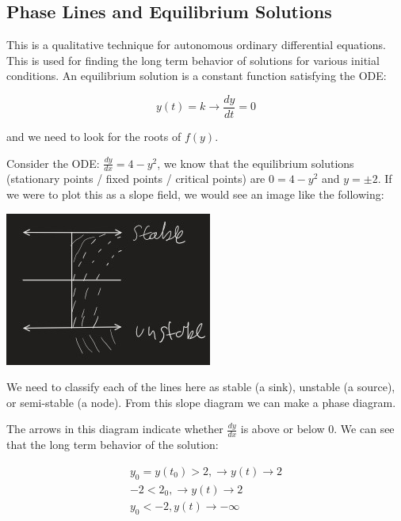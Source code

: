 \subsection{}
\subsection{Phase Lines and Equilibrium Solutions}

  This is a qualitative technique for autonomous ordinary differential equations. This is used for finding the long term behavior of solutions for various initial conditions. An equilibrium solution is a constant function satisfying the ODE:

  \[
    y(t)=k\to\frac{dy}{dt}=0
  \]

  and we need to look for the roots of $f(y)$.

  \begin{problem}
    Consider the ODE: $\frac{dy}{dx}=4-y^2$, we know that the equilibrium solutions (stationary points / fixed points / critical points) are $0=4-y^2$ and $y=\pm2$.  If we were to plot this as a slope field, we would see an image like the following:
  
    \begin{center}
      \includegraphics{resource/images/2.7 Example 1.jpg}
    \end{center}

    We need to classify each of the lines here as stable (a sink), unstable (a source), or semi-stable (a node). From this slope diagram we can make a phase diagram.

      

    The arrows in this diagram indicate whether $\frac{dy}{dx}$ is above or below $0$. We can see that the long term behavior of the solution:

    \[
      \begin{aligned}
        y_0 = y(t_0) > 2,\to y(t)\to 2\\
        - 2 < 2_0,\to y(t)\to 2\\
        y_0 <- 2, y(t)\to -\infty\\
      \end{aligned}
    \]
  \end{problem}

